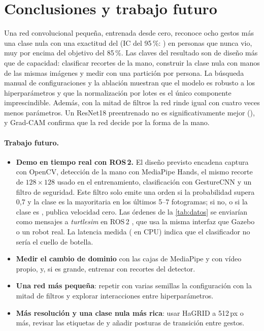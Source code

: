 \section{Conclusiones y trabajo futuro}
\label{sec:conclusiones}

Una red convolucional pequeña, entrenada desde cero, reconoce ocho gestos más una clase nula con
una exactitud del \AccTestFinal{} (IC del 95\,\%: \AccTestFinalIC) en personas que nunca vio, muy
por encima del objetivo del 85\,\%. Las claves del resultado son de diseño más que de capacidad:
clasificar recortes de la mano, construir la clase nula con manos de las mismas imágenes y medir
con una partición por persona. La búsqueda manual de \NConfigsBusqueda{} configuraciones y la
ablación muestran que el modelo es robusto a los hiperparámetros y que la normalización por lotes
es el único componente imprescindible. Además, con la mitad de filtros la red rinde igual con
cuatro veces menos parámetros. Un ResNet18 preentrenado no es significativamente mejor
(\PmcnemarFinalResnet), y Grad-CAM confirma que la red decide por la forma de la mano.

\paragraph{Trabajo futuro.}
\begin{itemize}
  \item \textbf{Demo en tiempo real con ROS\,2.} El diseño previsto encadena captura con OpenCV,
    detección de la mano con MediaPipe Hands, el mismo recorte de $128\times128$ usado en el
    entrenamiento, clasificación con GestureCNN y un filtro de seguridad. Este filtro solo emite
    una orden si la probabilidad supera 0,7 y la clase es la mayoritaria en los últimos 5--7
    fotogramas; si no, o si la clase es , publica velocidad cero. Las órdenes de
    la \cref{tab:datos} se enviarían como mensajes  a \emph{turtlesim} en ROS\,2
    \citep{macenski2022ros2}, que usa la misma interfaz que Gazebo o un robot real. La latencia
    medida (\LatCpuFinal{} en CPU) indica que el clasificador no sería el cuello de botella.
  \item \textbf{Medir el cambio de dominio} con las cajas de MediaPipe y con vídeo propio, y, si
    es grande, entrenar con recortes del detector.
  \item \textbf{Una red más pequeña}: repetir con varias semillas la configuración con la mitad
    de filtros y explorar interacciones entre hiperparámetros.
  \item \textbf{Más resolución y una clase nula más rica}: usar HaGRID a 512\,px o más, revisar
    las etiquetas de  y añadir posturas de transición entre gestos.
\end{itemize}
